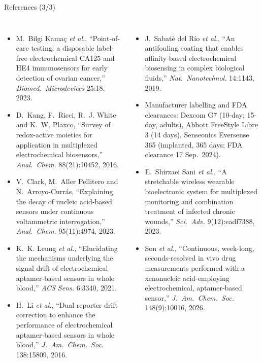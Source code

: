 \documentclass[10pt, aspectratio=169]{beamer}
\begin{document}
\begin{frame}{References (3/3)}
\vspace{-0.2cm}
{\tiny
{}
\setlength{\leftmargini}{2.0em}
\begin{columns}[T]
\begin{itemize}\setlength{\itemsep}{2pt}\setlength{\parskip}{0pt}
  \item[{[21]}] M.~Bilgi Kama\c{c} \emph{et al.}, ``Point-of-care testing: a disposable label-free electrochemical CA125 and HE4 immunosensors for early detection of ovarian cancer,'' \emph{Biomed.\ Microdevices} 25:18, 2023.
  \item[{[22]}] D.~Kang, F.~Ricci, R.~J. White and K.~W. Plaxco, ``Survey of redox-active moieties for application in multiplexed electrochemical biosensors,'' \emph{Anal.\ Chem.} 88(21):10452, 2016.
  \item[{[23]}] V.~Clark, M.~Aller Pellitero and N.~Arroyo-Curr\'as, ``Explaining the decay of nucleic acid-based sensors under continuous voltammetric interrogation,'' \emph{Anal.\ Chem.} 95(11):4974, 2023.
  \item[{[24]}] K.~K. Leung \emph{et al.}, ``Elucidating the mechanisms underlying the signal drift of electrochemical aptamer-based sensors in whole blood,'' \emph{ACS Sens.} 6:3340, 2021.
  \item[{[25]}] H.~Li \emph{et al.}, ``Dual-reporter drift correction to enhance the performance of electrochemical aptamer-based sensors in whole blood,'' \emph{J.\ Am.\ Chem.\ Soc.} 138:15809, 2016.
\end{itemize}
\begin{itemize}\setlength{\itemsep}{2pt}\setlength{\parskip}{0pt}
  \item[{[26]}] J.~Sabat\`e del R\'io \emph{et al.}, ``An antifouling coating that enables affinity-based electrochemical biosensing in complex biological fluids,'' \emph{Nat.\ Nanotechnol.} 14:1143, 2019.
  \item[{[27]}] Manufacturer labelling and FDA clearances: Dexcom G7 (10-day; 15-day, adults), Abbott FreeStyle Libre 3 (14 days), Senseonics Eversense 365 (implanted, 365 days; FDA clearance 17 Sep.\ 2024).
  \item[{[28]}] E.~Shirzaei Sani \emph{et al.}, ``A stretchable wireless wearable bioelectronic system for multiplexed monitoring and combination treatment of infected chronic wounds,'' \emph{Sci.\ Adv.} 9(12):eadf7388, 2023.
  \item[{[29]}] Son \emph{et al.}, ``Continuous, week-long, seconds-resolved in vivo drug measurements performed with a xenonucleic acid-employing electrochemical, aptamer-based sensor,'' \emph{J.\ Am.\ Chem.\ Soc.} 148(9):10016, 2026.
\end{itemize}
\end{columns}}
\end{frame}
\end{document}
